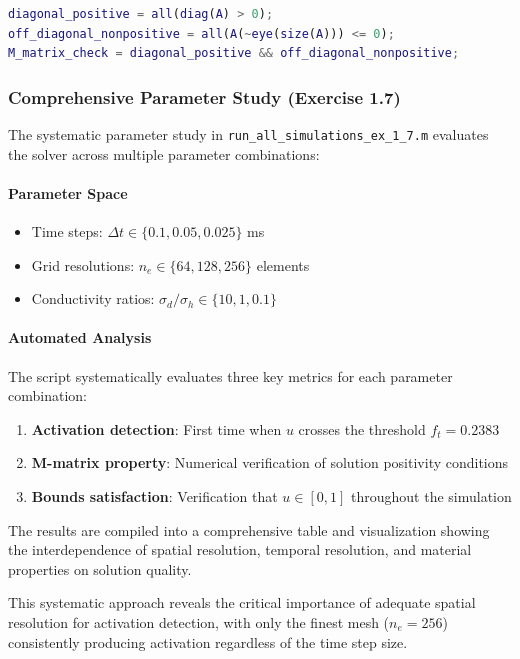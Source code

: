 \begin{lstlisting}[language=Matlab, caption=M-matrix verification]
% Check M-matrix property: A_ii > 0 and A_ij <= 0 for i \neq d_ij
diagonal_positive = all(diag(A) > 0);
off_diagonal_nonpositive = all(A(~eye(size(A))) <= 0);
M_matrix_check = diagonal_positive && off_diagonal_nonpositive;
\end{lstlisting}

\subsubsection{Comprehensive Parameter Study (Exercise 1.7)}

The systematic parameter study in \texttt{run\_all\_simulations\_ex\_1\_7.m} evaluates the solver across multiple parameter combinations:

\paragraph{Parameter Space}
\begin{itemize}
    \item Time steps: $\Delta t \in \{0.1, 0.05, 0.025\}$ ms
    \item Grid resolutions: $n_e \in \{64, 128, 256\}$ elements
    \item Conductivity ratios: $\sigma_d/\sigma_h \in \{10, 1, 0.1\}$
\end{itemize}

\paragraph{Automated Analysis}
The script systematically evaluates three key metrics for each parameter combination:
\begin{enumerate}
    \item \textbf{Activation detection}: First time when $u$ crosses the threshold $f_t = 0.2383$
    \item \textbf{M-matrix property}: Numerical verification of solution positivity conditions
    \item \textbf{Bounds satisfaction}: Verification that $u \in [0,1]$ throughout the simulation
\end{enumerate}

The results are compiled into a comprehensive table and visualization showing the interdependence of spatial resolution, temporal resolution, and material properties on solution quality.

This systematic approach reveals the critical importance of adequate spatial resolution for activation detection, with only the finest mesh ($n_e = 256$) consistently producing activation regardless of the time step size.

